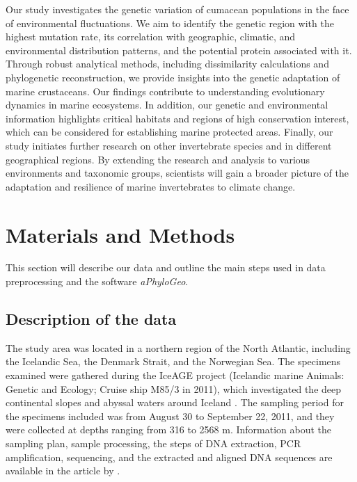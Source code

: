 Our study investigates the genetic variation of cumacean populations in the face of environmental fluctuations. We aim to identify the genetic region with the highest mutation rate, its correlation with geographic, climatic, and environmental distribution patterns, and the potential protein associated with it. Through robust analytical methods, including dissimilarity calculations and phylogenetic reconstruction, we provide insights into the genetic adaptation of marine crustaceans. Our findings contribute to understanding evolutionary dynamics in marine ecosystems. In addition, our genetic and environmental information highlights critical habitats and regions of high conservation interest, which can be considered for establishing marine protected areas. Finally, our study initiates further research on other invertebrate species and in different geographical regions. By extending the research and analysis to various environments and taxonomic groups, scientists will gain a broader picture of the adaptation and resilience of marine invertebrates to climate change.

\section{Materials and Methods}\label{materials-methods}
This section will describe our data and outline the main steps used in data preprocessing and the software \textit{aPhyloGeo}. 

\subsection{Description of the data}
The study area was located in a northern region of the North Atlantic, including the Icelandic Sea, the Denmark Strait, and the Norwegian Sea. The specimens examined were gathered during the IceAGE project (Icelandic marine Animals: Genetic and Ecology; Cruise ship M85/3 in 2011), which investigated the deep continental slopes and abyssal waters around Iceland \citep{meisner_prefacebiodiversity_2018}. The sampling period for the specimens included was from August 30 to September 22, 2011, and they were collected at depths ranging from 316 to 2568 m. Information about the sampling plan, sample processing, the steps of DNA extraction, PCR amplification, sequencing, and the extracted and aligned DNA sequences are available in the article by \citep{uhlir_adding_2021}.


